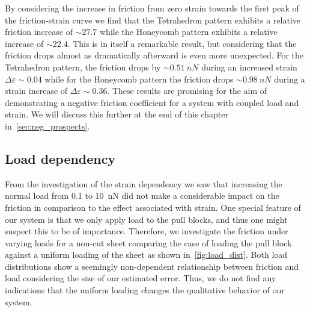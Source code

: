 By considering the increase in friction from zero strain towards the first peak
of the friction-strain curve we find that the Tetrahedron pattern exhibits a
relative friction increase of $\sim 27.7$ while the Honeycomb pattern exhibits a
relative increase of $\sim 22.4$. This is in itself a remarkable result, but
considering that the friction drops almost as dramatically afterward is even more unexpected. For the Tetrahedron pattern, the friction drops by
$\sim \SI{0.51}{nN}$ during an increased strain $\Delta \varepsilon \sim 0.04$
while for the Honeycomb pattern the friction drops $\sim\SI{0.98}{nN}$ during a strain increase of $\Delta \varepsilon \sim 0.36$. These results are promising for the aim of demonstrating a negative friction coefficient for a system with coupled load and strain. We will discuss this further at the end of this chapter in~\cref{sec:neg_prospects}.



\subsection{Load dependency}\label{sec:load_dependency}
From the investigation of the strain dependency we saw that increasing the normal load from 0.1 to \SI{10}{nN} did not make a considerable impact on the friction in comparison to the effect associated with strain. One special feature of our system is that we only apply load to the pull blocks, and thus one might suspect this to be of importance. Therefore, we investigate the friction under varying loads for a non-cut sheet comparing the case of loading the pull block against a  uniform loading of the sheet as shown in~\cref{fig:load_dist}. Both load distributions show a seemingly non-dependent relationship between friction and load considering the size of our estimated error. Thus, we do not find any indications that the uniform loading changes the qualitative behavior of our system.

